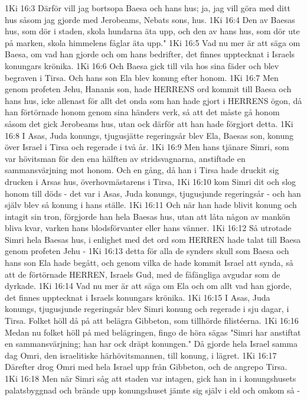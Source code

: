 1Ki 16:3  Därför vill jag bortsopa Baesa och hans hus; ja, jag vill göra med ditt hus såsom jag gjorde med Jerobeams, Nebats sons, hus.
1Ki 16:4  Den av Baesas hus, som dör i staden, skola hundarna äta upp, och den av hans hus, som dör ute på marken, skola himmelens fåglar äta upp."
1Ki 16:5  Vad nu mer är att säga om Baesa, om vad han gjorde och om hans bedrifter, det finnes upptecknat i Israels konungars krönika.
1Ki 16:6  Och Baesa gick till vila hos sina fäder och blev begraven i Tirsa. Och hans son Ela blev konung efter honom.
1Ki 16:7  Men genom profeten Jehu, Hananis son, hade HERRENS ord kommit till Baesa och hans hus, icke allenast för allt det onda som han hade gjort i HERRENS ögon, då han förtörnade honom genom sina händers verk, så att det måste gå honom såsom det gick Jerobeams hus, utan ock därför att han hade förgjort detta.
1Ki 16:8  I Asas, Juda konungs, tjugusjätte regeringsår blev Ela, Baesas son, konung över Israel i Tirsa och regerade i två år.
1Ki 16:9  Men hans tjänare Simri, som var hövitsman för den ena hälften av stridsvagnarna, anstiftade en sammansvärjning mot honom. Och en gång, då han i Tirsa hade druckit sig drucken i Arsas hus, överhovmästarens i Tirsa,
1Ki 16:10  kom Simri dit och slog honom till döds - det var i Asas, Juda konungs, tjugusjunde regeringsår - och han själv blev så konung i hans ställe.
1Ki 16:11  Och när han hade blivit konung och intagit sin tron, förgjorde han hela Baesas hus, utan att låta någon av mankön bliva kvar, varken hans blodsförvanter eller hans vänner.
1Ki 16:12  Så utrotade Simri hela Baesas hus, i enlighet med det ord som HERREN hade talat till Baesa genom profeten Jehu -
1Ki 16:13  detta för alla de synders skull som Baesa och hans son Ela hade begått, och genom vilka de hade kommit Israel att synda, så att de förtörnade HERREN, Israels Gud, med de fåfängliga avgudar som de dyrkade.
1Ki 16:14  Vad nu mer är att säga om Ela och om allt vad han gjorde, det finnes upptecknat i Israels konungars krönika.
1Ki 16:15  I Asas, Juda konungs, tjugusjunde regeringsår blev Simri konung och regerade i sju dagar, i Tirsa. Folket höll då på att belägra Gibbeton, som tillhörde filistéerna.
1Ki 16:16  Medan nu folket höll på med belägringen, fingo de höra sägas "Simri har anstiftat en sammansvärjning; han har ock dräpt konungen." Då gjorde hela Israel samma dag Omri, den israelitiske härhövitsmannen, till konung, i lägret.
1Ki 16:17  Därefter drog Omri med hela Israel upp från Gibbeton, och de angrepo Tirsa.
1Ki 16:18  Men när Simri såg att staden var intagen, gick han in i konungshusets palatsbyggnad och brände upp konungshuset jämte sig själv i eld och omkom så -
